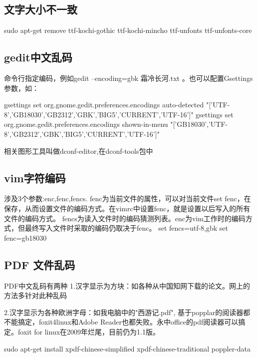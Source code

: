 \subsection{文字大小不一致}
\begin{shellcmd}
sudo apt-get remove ttf-kochi-gothic ttf-kochi-mincho ttf-unfonts ttf-unfonts-core
\end{shellcmd}

\subsection{gedit中文乱码}

 命令行指定编码，例如gedit --encoding=gbk 霜冷长河.txt 。也可以配置Gsettings参数，如：
   
   \begin{shellcmd}
    gsettings set org.gnome.gedit.preferences.encodings auto-detected 
	"['UTF-8','GB18030','GB2312','GBK','BIG5','CURRENT','UTF-16']"
    gsettings set org.gnome.gedit.preferences.encodings shown-in-menu 
	"['GB18030','UTF-8','GB2312','GBK','BIG5','CURRENT','UTF-16']"
   \end{shellcmd}  

	相关图形工具叫做dconf-editor,在dconf-tools包中

  
  


\subsection{vim字符编码}
涉及3个参数:enc,fenc,fencs.
fenc为当前文件的属性，可以对当前文件set fenc，在保存，从而设置文件的编码方式。在vimrc中设置fenc，就是设置以后写入的所有文件的编码方式。
fencs为读入文件时的编码猜测列表。enc为vim工作时的编码方式，但最终写入文件时采取的编码仍取决于fenc。
 set fencs=utf-8,gbk
 set fenc=gb18030

\subsection{PDF 文件乱码}
PDF中文乱码有两种
1.汉字显示为方块：如各种从中国知网下载的论文。网上的方法多针对此种乱码

2.汉字显示为各种欧洲字母：如我电脑中的"西游记.pdf", 基于popplar的阅读器都不能搞定，foxit4linux和Adobe Reader也都失败。永中office的pdf阅读器可以搞定。foxit for linux在2009年烂尾，目前仍为1.1版。
\begin{shellcmd}
sudo apt-get install xpdf-chinese-simplified xpdf-chinese-traditional poppler-data
\end{shellcmd}

